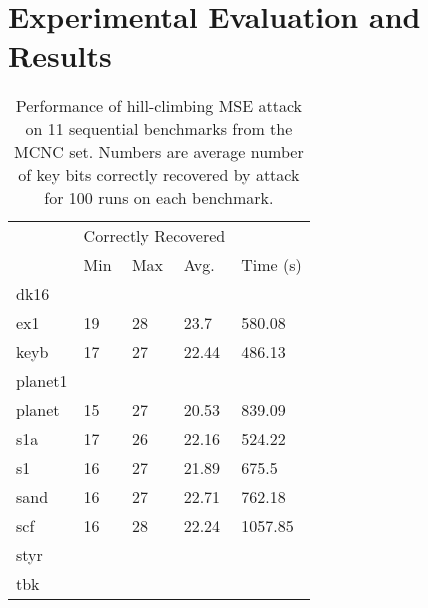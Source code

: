 \section{Experimental Evaluation and Results}

\begin{table}[ht]
\centering
\caption{Performance of hill-climbing MSE attack on 11 sequential benchmarks from the MCNC set. Numbers are average number of key bits correctly recovered by attack for 100 runs on each benchmark.}
\label{my-label}
\begin{tabular}{|l|l|l|l|l|}
\hline
                  & \multicolumn{3}{l|}{Correctly Recovered} &          %
                  \\ \cline{2-5} 
                  & Min         & Max         & Avg.         & Time (s) \\ \hline
dk16              &           &           &          &      \\ \hline
ex1              &  19         &  28         & 23.7         &  580.08      \\ \hline
keyb             &  17         &   27        & 22.44         &486.13\\ \hline
planet1             &           &           &          &   \\ \hline
planet             & 15          &   27        & 20.53         &839.09\\ \hline
s1a             &   17        &  26         &        22.16  &524.22
\\ \hline
s1             &     16      &    27       &         21.89  &675.5
\\ \hline
sand             & 16          &  27         &  22.71        &762.18
\\ \hline
scf             &   16        &   28        &    22.24      &1057.85
\\ \hline
styr             &           &           &          &\\ \hline
tbk             &           &           &          &\\ \hline

\end{tabular}
\end{table}

